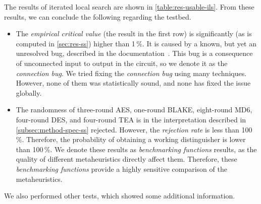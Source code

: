\documentclass[
    digital,    %
    oneside,    %
    color,
    11pt,
    nocover,
    notable,
    nolof,
    nolot,
]{fithesis3}
\begin{document}
The results of iterated local search are shown in \cref{table:res-usable-ils}. From these results, we can conclude the following regarding the testbed.

\begin{itemize}
    \item The \textit{empirical critical value} (the result in the first row) is significantly (as is computed in \cref{sec:res-ss}) higher than 1\,\%. It is caused by a known, but yet an unresolved bug, described in the documentation~\cite{EACirc-wiki-bug}. This bug is a consequence of unconnected input to output in the circuit, so we denote it as the \textit{connection bug}. We tried fixing the \textit{connection bug} using many techniques. However, none of them was statistically sound, and none has fixed the issue globally.
    \item The randomness of three-round AES, one-round BLAKE, eight-round MD6, four-round DES, and four-round TEA is in the interpretation described in \cref{subsec:method-spec-ss} rejected. However, the \textit{rejection rate} is less than 100\,\%. Therefore, the probability of obtaining a working distinguisher is lower than 100\,\%. We denote these results as \textit{benchmarking functions} results, as the quality of different metaheuristics directly affect them. Therefore, these \textit{benchmarking functions} provide a highly sensitive comparison of the metaheuristics.
\end{itemize}

We also performed other tests, which showed some additional information.
\end{document}
